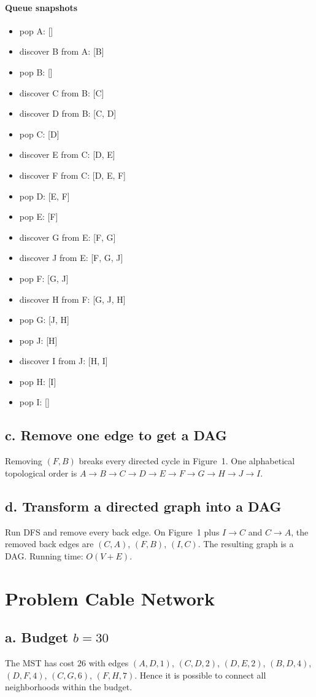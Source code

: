 \documentclass[11pt]{article}
\begin{document}
\paragraph{Queue snapshots}
\begin{itemize}
\item pop A: []
\item discover B from A: [B]
\item pop B: []
\item discover C from B: [C]
\item discover D from B: [C, D]
\item pop C: [D]
\item discover E from C: [D, E]
\item discover F from C: [D, E, F]
\item pop D: [E, F]
\item pop E: [F]
\item discover G from E: [F, G]
\item discover J from E: [F, G, J]
\item pop F: [G, J]
\item discover H from F: [G, J, H]
\item pop G: [J, H]
\item pop J: [H]
\item discover I from J: [H, I]
\item pop H: [I]
\item pop I: []
\end{itemize}
\subsection*{c. Remove one edge to get a DAG}
Removing \((F, B)\) breaks every directed cycle in Figure~1.
One alphabetical topological order is \(A \rightarrow B \rightarrow C \rightarrow D \rightarrow E \rightarrow F \rightarrow G \rightarrow H \rightarrow J \rightarrow I\).
\subsection*{d. Transform a directed graph into a DAG}
Run DFS and remove every back edge.
On Figure~1 plus \(I \rightarrow C\) and \(C \rightarrow A\), the removed back edges are \((C, A)\), \((F, B)\), \((I, C)\).
The resulting graph is a DAG.
Running time: \(O(V + E)\).
\section{Problem Cable Network}
\subsection*{a. Budget \(b = 30\)}
The MST has cost \( 26 \) with edges \((A, D, 1)\), \((C, D, 2)\), \((D, E, 2)\), \((B, D, 4)\), \((D, F, 4)\), \((C, G, 6)\), \((F, H, 7)\).
Hence it is possible to connect all neighborhoods within the budget.
\end{document}
